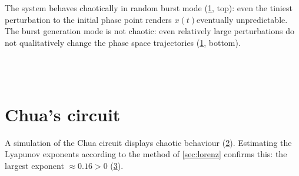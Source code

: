The system behaves chaotically in random burst mode (\cref{fig:neuron}, top): even the tiniest perturbation to the initial phase point renders $x(t)$eventually unpredictable. The burst generation mode is not chaotic: even relatively large perturbations do not qualitatively change the phase space trajectories (\cref{fig:neuron}, bottom).

\begin{figure}
\\[3em]
\\[0.5em]
\label{fig:neuron}
\end{figure}




\section{Chua's circuit}

A simulation of the Chua circuit displays chaotic behaviour (\cref{fig:chua}). Estimating the Lyapunov exponents according to the method of \cref{sec:lorenz} confirms this: the largest exponent $\approx 0.16 > 0$ (\cref{fig:LE_chua}).


\begin{figure}
\label{fig:chua}
\end{figure}

\begin{figure}
\label{fig:LE_chua}
\end{figure}
